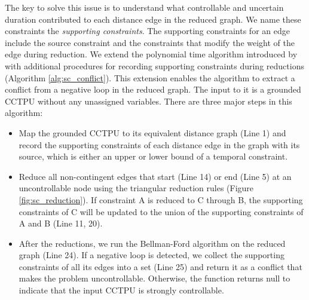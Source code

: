 \documentclass[jair,twoside,11pt,theapa]{article}
\begin{document}
The key to solve this issue is to understand what controllable and uncertain duration contributed to
each distance edge in the reduced graph. We name these constraints the
\textit{supporting constraints}. The supporting constraints for an edge include
the source constraint and the constraints that modify the weight of the edge
during reduction. We extend the polynomial time algorithm introduced by
 with additional procedures for recording
supporting constraints during reductions (Algorithm \ref{alg:sc_conflict}). This
extension enables the algorithm to extract a conflict from a negative loop in
the reduced graph. The input to it is a grounded CCTPU without any unassigned
variables. There are three major steps in this algorithm: 

\begin{itemize}
	\item Map the grounded CCTPU to its equivalent distance graph (Line 1) and
	record the supporting constraints of each distance edge in the graph with its
	source, which is either an upper or lower bound of a temporal constraint.
	
	\item Reduce all non-contingent edges that start (Line 14) or end (Line 5) at an
	uncontrollable node using the triangular reduction rules (Figure \ref{fig:sc_reduction}). If constraint A is
	reduced to C through B, the supporting constraints of C will be updated to the
	union of the supporting constraints of A and B (Line 11, 20). 
	
	\item After the reductions, we run the Bellman-Ford algorithm on the reduced
	graph (Line 24). If a negative loop is detected, we collect the supporting
	constraints of all its edges into a set (Line 25) and return it as a conflict
	that makes the problem uncontrollable. Otherwise, the function returns null to
	indicate that the input CCTPU is strongly controllable.
\end{itemize}
\end{document}
